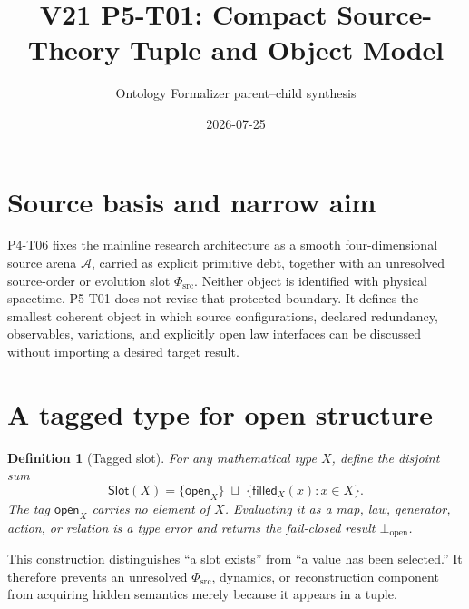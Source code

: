 \documentclass[11pt]{article}
\title{V21 P5-T01: Compact Source-Theory Tuple and Object Model}
\author{Ontology Formalizer parent--child synthesis}
\date{2026-07-25}
\newcommand{\A}{\mathcal A}
\newcommand{\PhiSrc}{\Phi_{\mathrm{src}}}
\newcommand{\Slot}{\mathsf{Slot}}
\newcommand{\Open}{\mathsf{open}}
\newcommand{\Filled}{\mathsf{filled}}
\newtheorem{definition}{Definition}
\begin{document}
\maketitle

\begin{center}
\end{center}

\section{Source basis and narrow aim}

P4-T06 fixes the mainline research architecture as a smooth
four-dimensional source arena \(\A\), carried as explicit primitive debt,
together with an unresolved source-order or evolution slot \(\PhiSrc\).
Neither object is identified with physical spacetime. P5-T01 does not revise
that protected boundary. It defines the smallest coherent object in which
source configurations, declared redundancy, observables, variations, and
explicitly open law interfaces can be discussed without importing a desired
target result.

\section{A tagged type for open structure}

\begin{definition}[Tagged slot]
For any mathematical type \(X\), define the disjoint sum
\[
  \Slot(X)
  =
  \{\Open_X\}\;\sqcup\;
  \{\Filled_X(x):x\in X\}.
\]
The tag \(\Open_X\) carries no element of \(X\). Evaluating it as a map, law,
generator, action, or relation is a type error and returns the fail-closed
result \(\bot_{\mathrm{open}}\).
\end{definition}

This construction distinguishes ``a slot exists'' from ``a value has been
selected.'' It therefore prevents an unresolved \(\PhiSrc\), dynamics, or
reconstruction component from acquiring hidden semantics merely because it
appears in a tuple.
\end{document}
